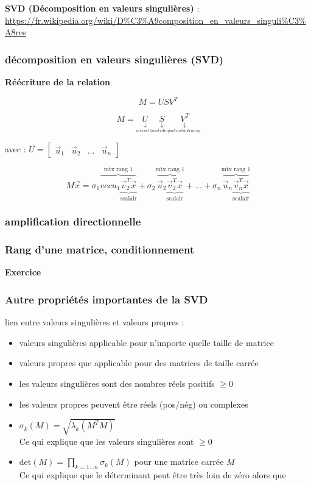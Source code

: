 \documentclass[document.tex]{subfiles}
\begin{document}
\textbf{SVD (Décomposition en valeurs singulières)} : \url{https://fr.wikipedia.org/wiki/D%C3%A9composition_en_valeurs_singuli%C3%A8res}


\subsubsection{décomposition en valeurs singulières (SVD)}
\textbf{Réécriture de la relation}

$$ \boxed{M = U S V^T} $$

$$ M = \underset{\underset{mtx ortho}{\downarrow}}{U} \underset{\underset{mtx diag}{\downarrow}}{S} \underset{\underset{mtx ortho transp}{\downarrow}}{V^T} $$

avec : $U = \begin{bmatrix} \vec{u}_1 & \vec{u}_2 & \ldots & \vec{u}_n \end{bmatrix} $

$$ M \vec{x}  = \sigma_1 \overbrace{vec{u}_1 \underbrace{\vec{v}_2^T \vec{x}}_{\text{scalair}}}^{\text{mtx rang 1}} + \sigma_2 \overbrace{\vec{u}_2 \underbrace{\vec{v}_2^T \vec{x}}_{\text{scalair}}}^{\text{mtx rang 1}} + \ldots + \sigma_n \overbrace{\vec{u}_n \underbrace{\vec{v}_n^T \vec{x}}_{\text{scalair}}}^{\text{mtx rang 1}}$$

\subsubsection{amplification directionnelle}

\subsubsection{Rang d'une matrice, conditionnement}

\textbf{Exercice}

\subsubsection{Autre propriétés importantes de la SVD}

lien entre valeurs singulières et valeurs propres :\\
\begin{itemize}
\item valeurs singulières applicable pour n'importe quelle taille de matrice
\item valeurs propres que applicable pour des matrices de taille carrée
\item les valeurs singulières sont des nombres réels positifs $\geq 0$
\item les valeurs propres peuvent être réels (pos/nég) ou complexes 
\item $\sigma_k(M)=\sqrt{\lambda_k(M^T M)}$ \\
Ce qui explique que les valeurs singulières sont  $\geq 0$
\item $\text{det}(M)=\prod_{k=1 \ldots n} \sigma_k(M)$ pour une matrice carrée $M$\\
Ce qui explique que le déterminant peut être très loin de zéro alors que
\end{itemize}
\end{document}
